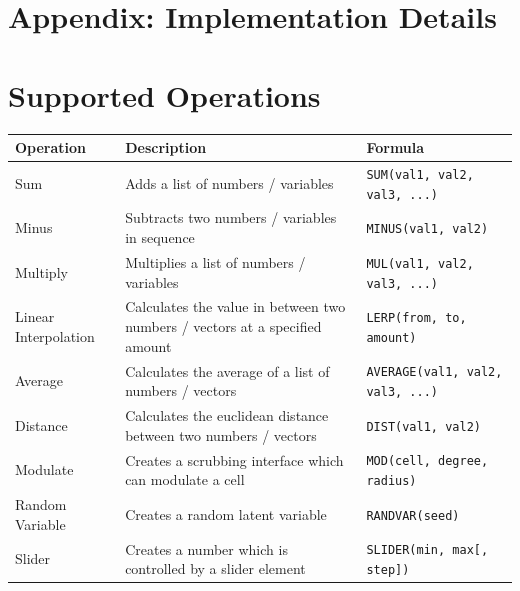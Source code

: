 \documentclass[letterpaper]{article}
\begin{document}
\onecolumn

\pagebreak

\normalsize


\section*{Appendix: Implementation Details}

\section*{Supported Operations}

\renewcommand{\arraystretch}{1.5}

\begin{center}
    \begin{tabular}{ | l | p{6cm} | p{5.6cm} |}
    \hline \textbf{Operation} & \textbf{Description} & \textbf{Formula} \\ \hline
    Sum & Adds a list of numbers / variables  & \texttt{SUM(val1, val2, val3, ...)} \\ \hline
    Minus & Subtracts two numbers / variables in sequence  & \texttt{MINUS(val1, val2)} \\ \hline
    Multiply & Multiplies a list of numbers / variables  & \texttt{MUL(val1, val2, val3, ...)} \\ \hline
    Linear Interpolation & Calculates the value in between two numbers / vectors at a specified amount  & \texttt{LERP(from, to, amount)} \\ \hline
    Average & Calculates the average of a list of numbers / vectors  & \texttt{AVERAGE(val1, val2, val3, ...)} \\ \hline
    Distance & Calculates the euclidean distance between two numbers / vectors  & \texttt{DIST(val1, val2)} \\ \hline
    Modulate & Creates a scrubbing interface which can modulate a cell  & \texttt{MOD(cell, degree, radius)} \\ \hline
    Random Variable & Creates a random latent variable  & \texttt{RANDVAR(seed)} \\ \hline
    Slider & Creates a number which is controlled by a slider element  & \texttt{SLIDER(min, max[, step])} \\ \hline
    \end{tabular}
\end{center}
\end{document}
